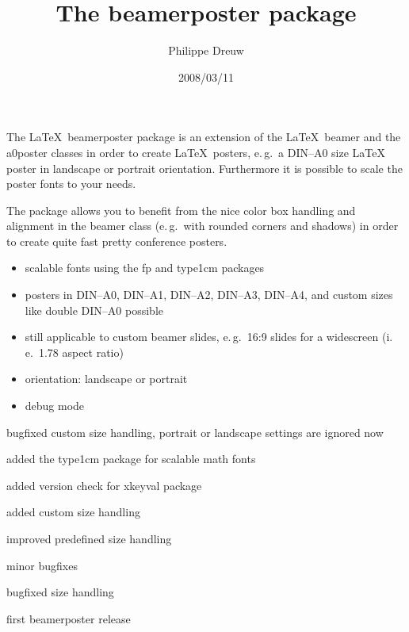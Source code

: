 \documentclass[pagesize=auto]{scrartcl}
\title{The \textsf{beamerposter} package}
\author{Philippe Dreuw}
\date{2008/03/11}
\begin{document}
\maketitle

\noindent
The \LaTeX\ \textsf{beamerposter} package is an extension of the \LaTeX\ \textsf{beamer} and the  
\textsf{a0poster} classes in order to create \LaTeX\ posters, e.\,g.\ a DIN--A0 size \LaTeX\ %
poster in landscape or portrait orientation. Furthermore it is possible 
to scale the poster fonts to your needs. 

The package allows you to benefit from the nice color box handling and 
alignment in the \textsf{beamer} class (e.\,g.\ with rounded corners and shadows) 
in order to create quite fast pretty conference posters.


%
\begin{itemize}
\item scalable fonts using the \textsf{fp} and \textsf{type1cm} packages
\item posters in DIN--A0, DIN--A1, DIN--A2, DIN--A3, DIN--A4, and custom sizes 
  like double DIN--A0 possible
\item still applicable to custom beamer slides, e.\,g.\ 16:9 slides for a 
  widescreen (i.\,e.\ 1.78 aspect ratio)
\item orientation: landscape or portrait
\item debug mode
\end{itemize}


%
\begin{labeling}[\hspace{\labelsep}--]{1.07}
\item[1.07] bugfixed custom size handling, portrait or landscape settings are ignored now
\item[1.06] added the \textsf{type1cm} package for scalable math fonts
\item[1.05] added version check for \textsf{xkeyval} package
\item[1.04] added custom size handling
\item[1.03] improved predefined size handling
\item[1.02] minor bugfixes
\item[1.01] bugfixed size handling
\item[1.00] first \textsf{beamerposter} release
\end{labeling}
\end{document}
